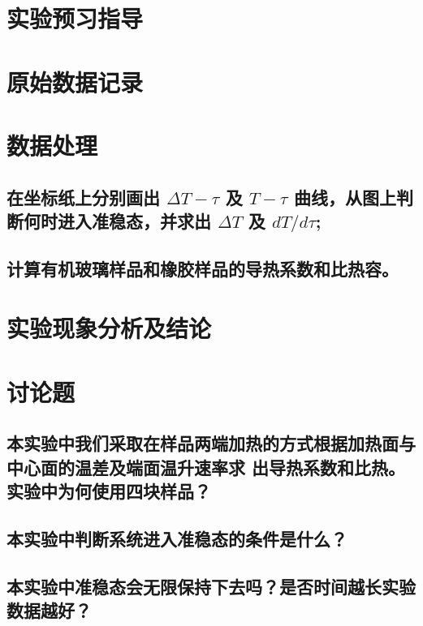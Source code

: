 \documentclass[signature=data]{physicsreport}
\begin{document}
\maketitle

\section{实验预习指导}
\newpage

\section{原始数据记录}
\makeatletter
{}
\makeatother

\newpage

\section{数据处理}
\subsection{在坐标纸上分别画出 $\Delta T-\tau $ 及 $T-\tau$ 曲线，从图上判断何时进入准稳态，并求出 $\Delta T$ 及 $dT/d\tau$;}


\subsection{计算有机玻璃样品和橡胶样品的导热系数和比热容。}

\newpage

\section{实验现象分析及结论}

\section{讨论题}



\subsection{本实验中我们采取在样品两端加热的方式根据加热面与中心面的温差及端面温升速率求
出导热系数和比热。实验中为何使用四块样品？}

\subsection{本实验中判断系统进入准稳态的条件是什么？}

\subsection{本实验中准稳态会无限保持下去吗？是否时间越长实验数据越好？}
\end{document}
